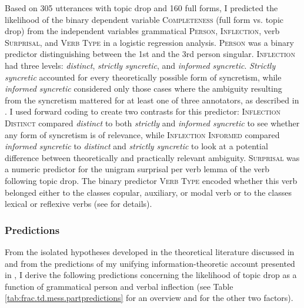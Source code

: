 Based on 305 utterances with topic drop and 160 full forms, I predicted the likelihood of the binary dependent variable \textsc{Completeness} (full form vs. topic drop) from the independent variables grammatical \textsc{Person}, \textsc{Inflection}, verb \textsc{Surprisal}, and \textsc{Verb Type} in a logistic regression analysis.
\textsc{Person} was a binary predictor distinguishing between the 1st and the 3rd person singular.
\textsc{Inflection} had three levels: \textit{distinct}, \textit{strictly syncretic}, and \textit{informed syncretic}.
\textit{Strictly syncretic} accounted for every theoretically possible form of syncretism, while \textit{informed syncretic} considered only those cases where the ambiguity resulting from the syncretism mattered for at least one of three annotators, as described in .
I used forward coding to create two contrasts for this predictor: \textsc{Inflection Distinct} compared \textit{distinct} to both \textit{strictly} and \textit{informed syncretic} to see whether any form of syncretism is of relevance, while \textsc{Inflection Informed} compared \textit{informed syncretic} to \textit{distinct} and \textit{strictly syncretic} to look at a potential difference between theoretically and practically relevant ambiguity.
\textsc{Surprisal} was a numeric predictor for the unigram surprisal per verb lemma of the verb following topic drop.
The binary predictor \textsc{Verb Type} encoded whether this verb belonged either to the classes copular,  auxiliary,  or modal verb  or to the classes lexical  or reflexive verbs  (see  for details).

\subsubsection{Predictions}
From the isolated hypotheses developed in the theoretical literature discussed in  and from the predictions of my unifying information-theoretic account presented in , I derive the following predictions concerning the likelihood of topic drop as a function of grammatical person and verbal inflection (see Table \ref{tab:frac.td.mess.partpredictions} for an overview and  for the other two factors).

